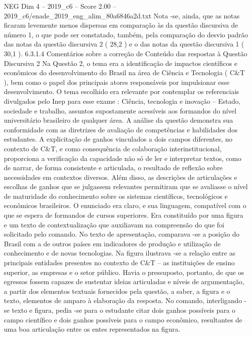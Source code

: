 \begin{textsample}{NEG Dim 4 – 2019\_c6 – Score 2.00 – 2019\_c6/enade\_2019\_eng\_alim\_80a6846a2d.txt}
Nota -se, ainda, que as notas ficaram levemente menos dispersas em comparação às da questão discursiva de número 1, o que pode ser constatado, também, pela comparação do desvio padrão das notas da questão discursiva 2 ( 28,2 ) e o das notas da questão discursiva 1 ( 30,1 ). 6.3.1.4 Comentários sobre a correção de Conteúdo das respostas à Questão Discursiva 2 Na Questão 2, o tema era a identificação de impactos científicos e econômicos do desenvolvimento do Brasil na área de Ciência e Tecnologia ( C\&T ), bem como o papel dos principais atores responsáveis por impulsionar esse desenvolvimento.
O tema escolhido era relevante por contemplar os referenciais divulgados pelo Inep para esse exame : Ciência, tecnologia e inovação – Estado, sociedade e trabalho, assuntos supostamente acessíveis aos formandos do nível universitário brasileiro de qualquer área.
A análise da questão demonstra sua conformidade com as diretrizes de avaliação de competências e habilidades dos estudantes.
A explicitação de ganhos vinculados a dois campos diferentes, no contexto de C\&T, e como consequência de colaboração interinstitucional, proporciona a verificação da capacidade não só de ler e interpretar textos, como de narrar, de forma consistente e articulada, o resultado de reflexão sobre necessidades em contextos diversos.
Além disso, as descrições de articulações e escolhas de ganhos que se julgassem relevantes permitiram que se avaliasse o nível de maturidade do conhecimento sobre os sistemas científicos, tecnológicos e econômicos brasileiros.
O enunciado era claro, e sua linguagem, compatível com o que se espera de formandos de cursos superiores.
Era constituído por uma figura e um texto de contextualização que auxiliavam na compreensão do que foi solicitado pelo comando.
No texto de apresentação, comparava -se a posição do Brasil com a de outros países em indicadores de produção e utilização de conhecimento e de novas tecnologias.
Na figura ilustrava -se a relação entre as principais entidades presentes no contexto de C\&T – as instituições de ensino superior, as empresas e o setor público.
Havia o pressuposto, portanto, de que os egressos fossem capazes de sustentar ideias articuladas e níveis de argumentação, a partir dos elementos textuais fornecidos pela questão, a saber, a figura e o texto, elementos de amparo à elaboração da resposta.
No comando, interligando -se texto e figura, pedia -se para o estudante citar dois ganhos possíveis para o campo científico e dois ganhos possíveis para o campo econômico, resultantes de uma boa articulação entre os entes representados na figura.

\end{textsample}
